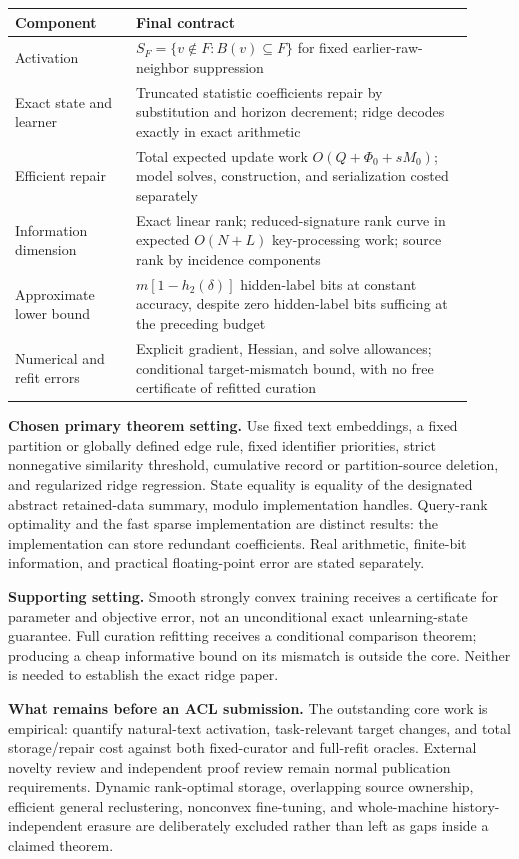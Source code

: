 \documentclass[11pt,a4paper]{article}
\theoremstyle{definition}\newtheorem{definition}[theorem]{Definition}
\begin{document}
\begin{center}\small
\begin{tabular}{p{0.24\linewidth}p{0.67\linewidth}}
\toprule
Component & Final contract\\\midrule
Activation & $S_F=\{v\notin F:B(v)\subseteq F\}$ for fixed earlier-raw-neighbor suppression\\[3pt]
Exact state and learner & Truncated statistic coefficients repair by substitution and horizon decrement; ridge decodes exactly in exact arithmetic\\[3pt]
Efficient repair & Total expected update work $O(Q+\Phi_0+sM_0)$; model solves, construction, and serialization costed separately\\[3pt]
Information dimension & Exact linear rank; reduced-signature rank curve in expected $O(N+L)$ key-processing work; source rank by incidence components\\[3pt]
Approximate lower bound & $m[1-h_2(\delta)]$ hidden-label bits at constant accuracy, despite zero hidden-label bits sufficing at the preceding budget\\[3pt]
Numerical and refit errors & Explicit gradient, Hessian, and solve allowances; conditional target-mismatch bound, with no free certificate of refitted curation\\
\bottomrule
\end{tabular}
\end{center}

\textbf{Chosen primary theorem setting.} Use fixed text embeddings, a fixed partition or globally defined edge rule, fixed identifier priorities, strict nonnegative similarity threshold, cumulative record or partition-source deletion, and regularized ridge regression. State equality is equality of the designated abstract retained-data summary, modulo implementation handles. Query-rank optimality and the fast sparse implementation are distinct results: the implementation can store redundant coefficients. Real arithmetic, finite-bit information, and practical floating-point error are stated separately.

\textbf{Supporting setting.} Smooth strongly convex training receives a certificate for parameter and objective error, not an unconditional exact unlearning-state guarantee. Full curation refitting receives a conditional comparison theorem; producing a cheap informative bound on its mismatch is outside the core. Neither is needed to establish the exact ridge paper.

\textbf{What remains before an ACL submission.} The outstanding core work is empirical: quantify natural-text activation, task-relevant target changes, and total storage/repair cost against both fixed-curator and full-refit oracles. External novelty review and independent proof review remain normal publication requirements. Dynamic rank-optimal storage, overlapping source ownership, efficient general reclustering, nonconvex fine-tuning, and whole-machine history-independent erasure are deliberately excluded rather than left as gaps inside a claimed theorem.
\end{document}
